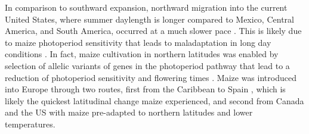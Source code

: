\documentclass[9pt,twocolumn,twoside]{BioRxiv}
\begin{document}
In comparison to southward expansion, northward migration into the current United States, where summer daylength is longer compared to Mexico, Central America, and South America, occurred at a much slower pace \cite{Da_Fonseca2015-zh, Swarts2017-ge}. 
This is likely due to maize photoperiod sensitivity that leads to maladaptation in long day conditions \cite{Hung2012-ms}. 
In fact, maize cultivation in northern latitudes was enabled by selection of allelic variants of genes in the photoperiod pathway that lead to a reduction of photoperiod sensitivity and flowering times \cite{Liang2018-af, Guo2018-on, Coles2010-db, Huang2018-ga, Yang2013-lg, Salvi2007-ku, Wang2017-bc, Hung2012-ms}.
Maize was introduced into Europe through two routes, first from the Caribbean to Spain \cite{Brandolini1968-eu, Brandenburg2017-ii}, which is likely the quickest latitudinal change maize experienced, and second from Canada and the US with maize pre-adapted to northern latitudes and lower temperatures\cite{Brandenburg2017-ii}.
\end{document}
